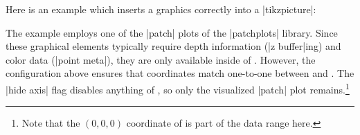 Here is an example which inserts a \PGFPlots{} graphics correctly into a
|tikzpicture|:
%
\begin{codeexample}[]
\end{codeexample}
%
\noindent The example employs one of the |patch| plots of the |patchplots|
library. Since these graphical elements typically require depth information
(|z buffer|ing) and color data (|point meta|), they are only available inside
of \PGFPlots{}. However, the configuration above ensures that coordinates match
one-to-one between \PGFPlots{} and \Tikz{}. The |hide axis| flag disables
anything of \PGFPlots{}, so only the visualized |patch| plot
remains.\footnote{Note that the $(0,0,0)$ coordinate of \PGFPlots{} is part of
the data range here.}
